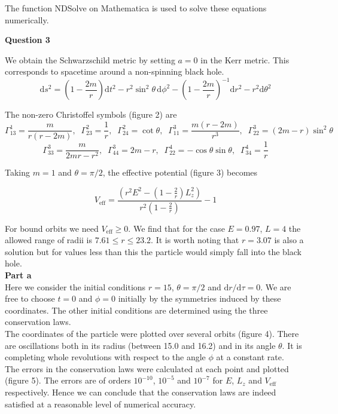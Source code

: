 \documentclass[12pt]{extarticle}
\begin{document}
The function NDSolve on Mathematica is used to solve these equations numerically.

\begin{center}
\textbf{Question 3}
\end{center}

We obtain the Schwarzschild metric by setting $a=0$ in the Kerr metric. This corresponds to spacetime around a non-spinning black hole. 
$$\mathrm{d}s^2 = \left(1-\frac{2m}{r}\right)\mathrm{d}t^2-r^2\sin^2\theta \,\mathrm{d}\phi^2-\left(1-\frac{2m}{r}\right)^{-1}\mathrm{d}r^2-r^2\mathrm{d}\theta^2$$

The non-zero Christoffel symbols (figure 2) are
$$\Gamma_{13}^1 = \frac{m}{r(r-2m)},\;\; \Gamma_{23}^2 =\frac{1}{r} ,\;\; \Gamma_{24}^2 = \cot\theta ,\;\; \Gamma_{11}^3 = \frac{m(r-2m)}{r^3} ,\;\; \Gamma_{22}^3 = (2m-r)\sin^2\theta$$
$$ \Gamma_{33}^3 = \frac{m}{2mr-r^2},\;\; \Gamma_{44}^3 =2m-r ,\;\; \Gamma_{22}^4 = -\cos\theta\sin\theta,\;\; \Gamma_{34}^4 =\frac{1}{r}$$

Taking $m=1$ and $\theta = \pi/2$, the effective potential (figure 3) becomes

$$V_{\mathrm{eff}} = \frac{\left(r^2E^2
-\left(1-\frac{2}{r}\right)L_z^2\right)}{r^2\left(1-\frac{2}{r}\right)}-1$$

For bound orbits we need $V_{\mathrm{eff}} \geq 0$. We find that for the case $E = 0.97$, $L=4$ the allowed range of radii is $7.61 \leq r \leq 23.2$. It is worth noting that $r = 3.07$ is also a solution but for values less than this the particle would simply fall into the black hole.\\

\textbf{Part a}\\

Here we consider the initial conditions $r = 15$, $\theta = \pi/2$ and $\mathrm{d}r/\mathrm{d}\tau = 0$. We are free to choose $t = 0$ and $\phi = 0$ initially by the symmetries induced by these coordinates. The other initial conditions are determined using the three conservation laws. \\

The coordinates of the particle were plotted over several orbits (figure 4). There are oscillations both in its radius (between 15.0 and 16.2) and in its angle $\theta$. It is completing whole revolutions with respect to the angle $\phi$ at a constant rate. \\

The errors in the conservation laws were calculated at each point and plotted (figure 5). The errors are of orders $10^{-10}$, $10^{-5}$ and $10^{-7}$ for $E$, $L_z$ and $V_{\mathrm{eff}}$ respectively. Hence we can conclude that the conservation laws are indeed satisfied at a reasonable level of numerical accuracy. \\
\end{document}
